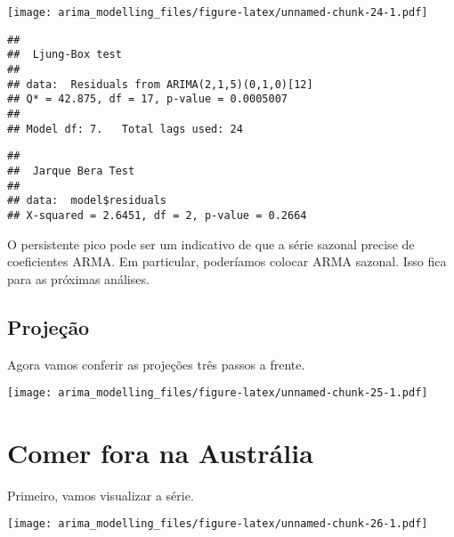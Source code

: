 \documentclass[]{article}
\newenvironment{Shaded}{\begin{snugshade}}{\end{snugshade}}
\newcommand{\DataTypeTok}[1]{\textcolor[rgb]{0.13,0.29,0.53}{#1}}
\newcommand{\DecValTok}[1]{\textcolor[rgb]{0.00,0.00,0.81}{#1}}
\newcommand{\KeywordTok}[1]{\textcolor[rgb]{0.13,0.29,0.53}{\textbf{#1}}}
\newcommand{\NormalTok}[1]{#1}
\newcommand{\OperatorTok}[1]{\textcolor[rgb]{0.81,0.36,0.00}{\textbf{#1}}}
\newcommand{\StringTok}[1]{\textcolor[rgb]{0.31,0.60,0.02}{#1}}
\begin{document}
\texttt{[image: arima\_modelling\_files/figure-latex/unnamed-chunk-24-1.pdf]}

\begin{verbatim}
## 
##  Ljung-Box test
## 
## data:  Residuals from ARIMA(2,1,5)(0,1,0)[12]
## Q* = 42.875, df = 17, p-value = 0.0005007
## 
## Model df: 7.   Total lags used: 24
\end{verbatim}

\begin{Shaded}
\end{Shaded}

\begin{verbatim}
## 
##  Jarque Bera Test
## 
## data:  model$residuals
## X-squared = 2.6451, df = 2, p-value = 0.2664
\end{verbatim}

O persistente pico pode ser um indicativo de que a série sazonal precise
de coeficientes ARMA. Em particular, poderíamos colocar ARMA sazonal.
Isso fica para as próximas análises.

\hypertarget{projeuxe7uxe3o-1}{%
\subsection{Projeção}\label{projeuxe7uxe3o-1}}

Agora vamos conferir as projeções três passos a frente.

\begin{Shaded}
\end{Shaded}

\texttt{[image: arima\_modelling\_files/figure-latex/unnamed-chunk-25-1.pdf]}

\hypertarget{comer-fora-na-austruxe1lia}{%
\section{Comer fora na Austrália}\label{comer-fora-na-austruxe1lia}}

Primeiro, vamos visualizar a série.

\texttt{[image: arima\_modelling\_files/figure-latex/unnamed-chunk-26-1.pdf]}
\end{document}
